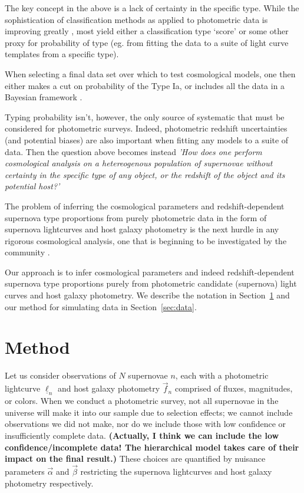 \documentclass[12pt, onecolumn]{emulateapj}
\newcommand{\textul}{\underline}
\begin{document}
The key concept in the above is a lack of certainty in the specific type. While the sophistication of classification methods as applied to photometric data is improving greatly \cite{classification_papers}, most yield either a classification type `score' or some other proxy for probability of type (eg. from fitting the data to a suite of light curve templates from a specific type).

When selecting a final data set over which to test cosmological models, one then either makes a cut on probability of the Type Ia, or includes all the data in a Bayesian framework \citet{kunz_bayesian_2007, kelly_flexible_2008, hlozek_photometric_2012, lochner_2012, newling_2012}.

Typing probability isn't, however, the only source of systematic that must be considered for photometric surveys. Indeed, photometric redshift uncertainties (and potential biases) are also important when fitting any models to a suite of data. 
Then the question above becomes instead \textit{'How does one perform cosmological analysis on a hetereogenous population of supernovae without certainty in the specific type of any object, or the redshift of the object and its potential host?'}

The problem of inferring the cosmological parameters and redshift-dependent supernova type proportions from purely photometric data in the form of supernova lightcurves and host galaxy photometry is the next hurdle in any rigorous cosmological analysis, one that is beginning to be investigated by the community \cite{lochner_2017}.

Our approach is to infer cosmological parameters and indeed redshift-dependent supernova type proportions purely from photometric candidate (supernova) light curves and host galaxy photometry. We describe the notation in Section~\ref{sec:method} and our method for simulating data in Section~\ref{sec:data}.

\section{Method}
\label{sec:method}



Let us consider observations of $N$ supernovae $n$, each with a photometric lightcurve $\textul{\ell}_{n}$ and host galaxy photometry $\vec{f}_{n}$ comprised of fluxes, magnitudes, or colors.  When we conduct a photometric survey, not all supernovae in the universe will make it into our sample due to selection effects; we cannot include observations we did not make, nor do we include those with low confidence or insufficiently complete data.  \textbf{(Actually, I think we can include the low confidence/incomplete data!  The hierarchical model takes care of their impact on the final result.)}  These choices are quantified by nuisance parameters $\vec{\alpha}$ and $\vec{\beta}$ restricting the supernova lightcurves and host galaxy photometry respectively.  
\end{document}
